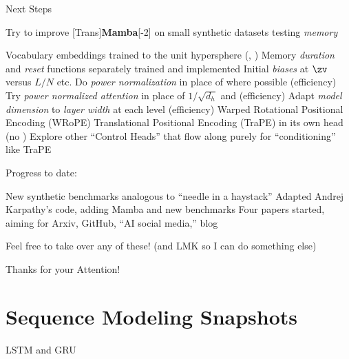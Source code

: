 \begin{slide}[\slideopts,toc={Plan}]{Next Steps}
  \vspace{-1em}
  \begin{itemize}
    \mpitem Try to improve [Trans]\textbf{Mamba}[-2] on small synthetic datasets testing \emph{memory}
    \begin{itemize}
      \mpitem Vocabulary embeddings trained to the unit hypersphere (\eg, )
      \mpitem Memory \emph{duration} and \emph{reset} functions separately trained and implemented
      \mpitem Initial \emph{biases} at $\zv$ versus $L/N$ etc.
      \mpitem Do \emph{power normalization} in place of  where possible (efficiency)
      \mpitem Try \emph{power normalized attention} in place of $1/\sqrt{d_h}$ and  (efficiency)
      \mpitem Adapt \emph{model dimension} to \emph{layer width} at each level (efficiency)
      \mpitem Warped Rotational Positional Encoding (WRoPE)
      \mpitem Translational Positional Encoding (TraPE) in its own head (no )
      \mpitem Explore other ``Control Heads'' that flow along purely for ``conditioning'' like TraPE
    \end{itemize}
    \mpitem Progress to date:
    \begin{itemize}
      \mpitem New synthetic benchmarks analogous to ``needle in a haystack''
      \mpitem Adapted Andrej Karpathy's  code, adding Mamba and new benchmarks
      \mpitem Four papers started, aiming for Arxiv, GitHub, ``AI social media,'' blog
    \end{itemize}
    \mpitem Feel free to take over any of these! (and LMK so I can do something else)
  \end{itemize}
\end{slide}

\begin{slide}[\slideopts,toc={Hypersphere}]{Thanks for your Attention!}
\vspace{-1em}
\end{slide}

\section[\sectopts,toc={History Samples}]{Sequence Modeling Snapshots}

\begin{slidewhite}[\slideopts, toc={LSTM \& GRU}]{LSTM and GRU}
\vspace{-6em}
\end{slidewhite}


